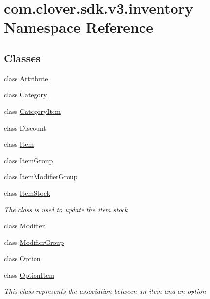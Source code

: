 \hypertarget{namespacecom_1_1clover_1_1sdk_1_1v3_1_1inventory}{}\section{com.\+clover.\+sdk.\+v3.\+inventory Namespace Reference}
\label{namespacecom_1_1clover_1_1sdk_1_1v3_1_1inventory}
\subsection*{Classes}
\begin{DoxyCompactItemize}
\item 
class \hyperlink{classcom_1_1clover_1_1sdk_1_1v3_1_1inventory_1_1_attribute}{Attribute}
\item 
class \hyperlink{classcom_1_1clover_1_1sdk_1_1v3_1_1inventory_1_1_category}{Category}
\item 
class \hyperlink{classcom_1_1clover_1_1sdk_1_1v3_1_1inventory_1_1_category_item}{Category\+Item}
\item 
class \hyperlink{classcom_1_1clover_1_1sdk_1_1v3_1_1inventory_1_1_discount}{Discount}
\item 
class \hyperlink{classcom_1_1clover_1_1sdk_1_1v3_1_1inventory_1_1_item}{Item}
\item 
class \hyperlink{classcom_1_1clover_1_1sdk_1_1v3_1_1inventory_1_1_item_group}{Item\+Group}
\item 
class \hyperlink{classcom_1_1clover_1_1sdk_1_1v3_1_1inventory_1_1_item_modifier_group}{Item\+Modifier\+Group}
\item 
class \hyperlink{classcom_1_1clover_1_1sdk_1_1v3_1_1inventory_1_1_item_stock}{Item\+Stock}
\begin{DoxyCompactList}\small\item\em The class is used to update the item stock \end{DoxyCompactList}\item 
class \hyperlink{classcom_1_1clover_1_1sdk_1_1v3_1_1inventory_1_1_modifier}{Modifier}
\item 
class \hyperlink{classcom_1_1clover_1_1sdk_1_1v3_1_1inventory_1_1_modifier_group}{Modifier\+Group}
\item 
class \hyperlink{classcom_1_1clover_1_1sdk_1_1v3_1_1inventory_1_1_option}{Option}
\item 
class \hyperlink{classcom_1_1clover_1_1sdk_1_1v3_1_1inventory_1_1_option_item}{Option\+Item}
\begin{DoxyCompactList}\small\item\em This class represents the association between an item and an option \end{DoxyCompactList}\item 

\end{DoxyCompactItemize}
